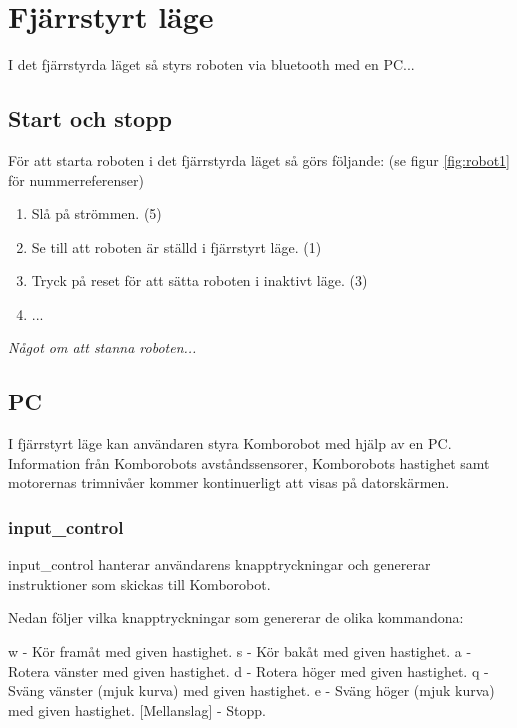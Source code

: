 
%
%


\section{Fjärrstyrt läge}
I det fjärrstyrda läget så styrs roboten via bluetooth med en PC...

\subsection{Start och stopp}
För att starta roboten i det fjärrstyrda läget så görs följande: (se figur \ref{fig:robot1} för nummerreferenser)

\begin{enumerate}
\item Slå på strömmen. (5)
\item Se till att roboten är ställd i fjärrstyrt läge. (1)
\item Tryck på reset för att sätta roboten i inaktivt läge. (3)
\item ... 
\end{enumerate}

\emph{Något om att stanna roboten...}

\subsection{PC}
I fjärrstyrt läge kan användaren styra Komborobot med hjälp av en PC.
Information från Komborobots avståndssensorer, Komborobots hastighet samt
motorernas trimnivåer kommer kontinuerligt att visas på datorskärmen.
\subsubsection{input\_control}
input\_control hanterar användarens knapptryckningar och genererar instruktioner
som skickas till Komborobot.

Nedan följer vilka knapptryckningar som genererar de olika kommandona:

w - Kör framåt med given hastighet.
s - Kör bakåt med given hastighet.
a - Rotera vänster med given hastighet.
d - Rotera höger med given hastighet.
q - Sväng vänster (mjuk kurva) med given hastighet.
e - Sväng höger (mjuk kurva) med given hastighet.
[Mellanslag] - Stopp.

